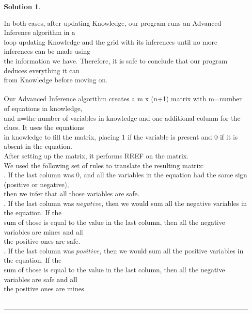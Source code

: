 \documentclass{article}
\theoremstyle{definition}
\def\fline{\rule{0.75\linewidth}{0.5pt}}
\newcommand{\finishline}{\vspace{-15pt}\begin{center}\fline\end{center}}
\newtheorem*{solution*}{Solution}
\newenvironment{solution}{\begin{solution*}}{{\finishline} \end{solution*}}
\begin{document}
\begin{solution}
\begin{tabbing}
    \>In both cases, after updating Knowledge, our program runs an Advanced Inference algorithm in a\\ \>loop updating Knowledge and the grid with its inferences until no more inferences can be made using\\ \> the information we have. Therefore, it is safe to conclude that our program deduces everything it can\\ \> from Knowledge before moving on.\\\\
    
    \>Our Advanced Inference algorithm creates a m x (n+1) matrix with m=number of equations in knowledge,\\ \>and n=the number of variables in knowledge and one additional column for the clues. It uses the equations\\ \>in knowledge to fill the matrix, placing 1 if the variable is present and 0 if it is absent in the equation.\\ \> After setting up the matrix, it performs RREF on the matrix.\\
    \>We used the following set of rules to translate the resulting matrix:\\
    \>. If the last column was $0$, and all the variables in the equation had the same sign (positive or negative),\\ \>\>then we infer that all those variables are safe. \\
    \>. If the last column was $negative$, then we would sum all the negative variables in the equation. If the\\ \>\>sum of those is equal to the value in the last column, then all the negative variables are mines and all\\ \>\>the positive ones are safe.\\
    \>. If the last column was $positive$, then we would sum all the positive variables in the equation. If the\\ \>\>sum of those is equal to the value in the last column, then all the negative variables are safe and all\\ \>\>the positive ones are mines.\\\\
    

\end{tabbing}
\end{solution}
\end{document}

